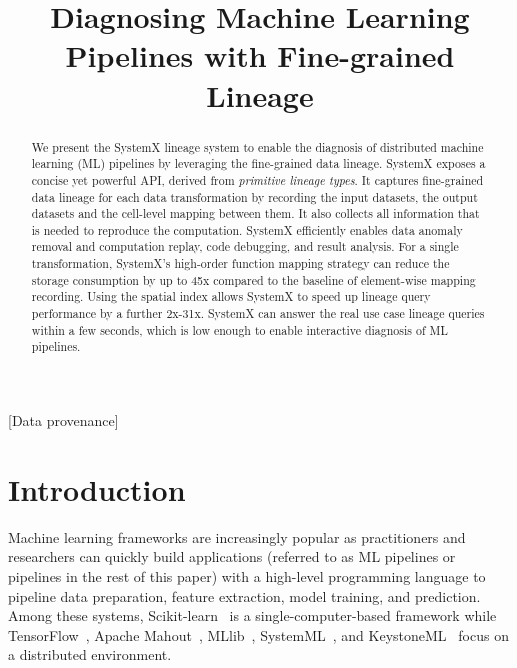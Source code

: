 \documentclass{sig-alternate}
\begin{document}
\title{Diagnosing Machine Learning Pipelines with Fine-grained Lineage}


\maketitle

\begin{abstract}
We present the SystemX lineage system to enable the diagnosis of distributed machine learning (ML) pipelines by leveraging the fine-grained
data lineage.  
SystemX exposes a concise yet powerful API, derived from \emph{primitive lineage types}. 
It captures fine-grained data lineage for each  data transformation by recording the input datasets, the output datasets and the cell-level mapping between them. 
It also collects all information that is needed to reproduce the computation.
SystemX efficiently enables data anomaly removal and computation replay, code debugging, and result analysis.
For a single transformation, SystemX's high-order function mapping strategy can reduce the storage consumption by up to 
45x compared to the baseline of element-wise mapping recording.
Using the spatial index allows SystemX to speed up lineage query performance by a further 2x-31x. 
SystemX can answer the real use case lineage queries within a few seconds, 
which is low enough to enable interactive diagnosis of ML pipelines.
\end{abstract}

[Data provenance]

\section{Introduction}
Machine learning frameworks are increasingly popular as practitioners and researchers can quickly
build applications (referred to as ML pipelines or pipelines in the rest of this paper) with a high-level 
programming language to pipeline data preparation, feature extraction, model training, and prediction. 
Among these systems, Scikit-learn~\cite{pedregosa2011scikit}
is a single-computer-based framework while TensorFlow~\cite{tensorflow15}, Apache Mahout~\cite{owen2011mahout}, MLlib~\cite{meng2015mllib}, 
SystemML~\cite{ghoting11systemml}, and KeystoneML~\cite{sparks15} focus on a distributed environment.
\end{document}

